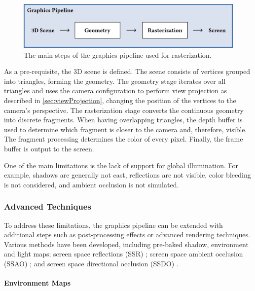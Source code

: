 \begin{figure}[H]
  \includegraphics[width=\columnwidth]{resources/graphics-pipeline.png}
  \caption{The main steps of the graphics pipeline used for rasterization.}
  \label{fig:graphics-pipeline}
\end{figure}

As a pre-requisite, the 3D scene is defined. The scene consists of vertices grouped into triangles, forming the geometry. The geometry stage iterates over all triangles and uses the camera configuration to perform view projection as described in \autoref{sec:viewProjection}, changing the position of the vertices to the camera's perspective. The rasterization stage converts the continuous geometry into discrete fragments. When having overlapping triangles, the depth buffer is used to determine which fragment is closer to the camera and, therefore, visible. The fragment processing determines the color of every pixel. Finally, the frame buffer is output to the screen.

One of the main limitations is the lack of support for global illumination. For example, shadows are generally not cast, reflections are not visible, color bleeding is not considered, and ambient occlusion is not simulated.

\subsubsection{Advanced Techniques}

To address these limitations, the graphics pipeline can be extended with additional steps such as post-processing effects or advanced rendering techniques. Various methods have been developed, including pre-baked shadow, environment \cite{greene1986environment} and light maps; screen space reflections (SSR) \cite{screenSpaceReflectionsStackowiak}; screen space ambient occlusion (SSAO) \cite{bavoil2008ssao}; and screen space directional occlusion (SSDO) \cite{ritschel2009ssdo}.

\paragraph{Environment Maps}

